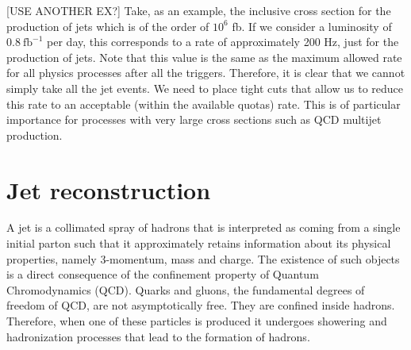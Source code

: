 [USE ANOTHER EX?] Take, as an example, the inclusive cross section for the production of jets which is of the order of $10^6$ fb. If we consider a luminosity of $0.8~\text{fb}^{-1}$ per day, this corresponds to a rate of approximately 200 Hz, just for the production of jets. Note that this value is the same as the maximum allowed rate for all physics processes after all the triggers. Therefore, it is clear that we cannot simply take all the jet events. We need to place tight cuts that allow us to reduce this rate to an acceptable (within the available quotas) rate. This is of particular importance for processes with very large cross sections such as QCD multijet production.




\section{Jet reconstruction}
\label{section:jet_reco}

A jet is a collimated spray of hadrons that is interpreted as coming from a single initial parton such that it approximately retains information about its physical properties, namely 3-momentum, mass and charge. The existence of such objects is a direct consequence of the confinement property of Quantum Chromodynamics (QCD). Quarks and gluons, the fundamental degrees of freedom of QCD, are not asymptotically free. They are confined inside hadrons. Therefore, when one of these particles is produced it undergoes showering and hadronization processes that lead to the formation of hadrons.

